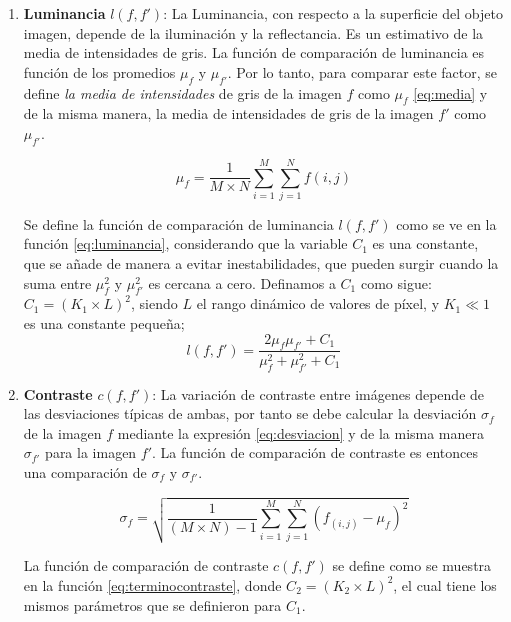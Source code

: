 \begin{enumerate}
  \item \textbf{Luminancia} $l(f,f')$: La Luminancia, con respecto a la superficie del objeto imagen, depende de la iluminación y la reflectancia. Es un estimativo de la media de intensidades de gris. La función de comparación de luminancia es función de los promedios $\mu_f$ y $\mu_{f'}$. Por lo tanto, para comparar este factor, se define \textit{la media de intensidades} de gris de la imagen $f$ como $\mu_f$ \eqref{eq:media} y de la misma manera, la media de intensidades de gris de la imagen $f'$ como $\mu_{f'}$.

  \begin{equation}
    \label{eq:media}
    \mu_{f}=\frac{1}{M \times N}\sum_{i=1}^M \sum_{j=1}^N f(i,j)
  \end{equation}
    
  Se define la función de comparación de luminancia $l(f,f')$ como se ve en la función \eqref{eq:luminancia}, considerando que la variable $C_1$ es una constante, que se añade de manera a evitar inestabilidades, que pueden surgir cuando la suma entre $\mu_f^2$ y $\mu_{f'}^2$ es cercana a cero. Definamos a $C_1$ como sigue: $C_1 = (K_1 \times L)^2$, siendo $L$ el rango dinámico de valores de píxel, y $K_1 \ll 1$ es una constante pequeña; \\

  \begin{equation}
    l(f,f')=\frac{2\mu_f\mu_{f'}+C_1}{\mu_f^2+\mu_{f'}^2+C_1}
    \label{eq:luminancia}
  \end{equation}

  \item \textbf{Contraste} $c(f,f')$: La variación de contraste entre imágenes depende de las desviaciones típicas de ambas, por tanto se debe calcular la desviación $\sigma_f$ de la imagen $f$ mediante la expresión \eqref{eq:desviacion} y de la misma manera $\sigma_{f'}$ para la imagen $f'$. La función de comparación de contraste es entonces una comparación de $\sigma_f$ y $\sigma_{f'}$.

    \begin{equation}
        \label{eq:desviacion}
        \sigma_{f}=\sqrt{\frac{1}{(M \times N)-1}\sum_{i=1}^M\sum_{j=1}^N(f_{(i,j)}-\mu_f)^2}
    \end{equation}

    La función de comparación de contraste $c(f,f')$ se define como se muestra en la función \eqref{eq:terminocontraste}, donde $C_2=(K_2 \times L)^2$, el cual tiene los mismos parámetros que se definieron para $C_1$.


\end{enumerate}
